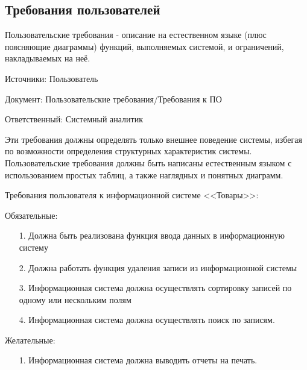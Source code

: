\subsection{Требования пользователей}

Пользовательские требования - описание на естественном языке (плюс поясняющие диаграммы) функций, выполняемых системой, и ограничений, накладываемых на неё.

Источники: Пользователь

Документ: Пользовательские требования/Требования к ПО

Ответственный: Системный аналитик

Эти требования должны определять только внешнее поведение системы, избегая по возможности определения структурных характеристик системы. Пользовательские требования должны быть написаны естественным языком с использованием простых таблиц, а также наглядных и понятных диаграмм.

Требования пользователя к информационной системе <<Товары>>:

Обязательные:

\begin{enumerate}
    \item [1.] Должна быть реализована функция ввода данных в информационную систему
    \item [2.] Должна работать функция удаления записи из информационной системы
    \item [3.] Информационная система должна осуществлять сортировку записей по одному или нескольким полям
    \item [4.] Информационная система должна осуществлять поиск по записям.
\end{enumerate}

Желательные:

\begin{enumerate}
    \item [1.] Информационная система должна выводить отчеты на печать.
\end{enumerate}